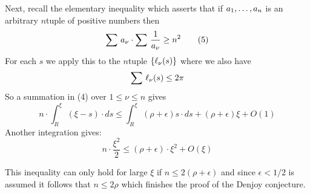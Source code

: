 \noindent
Next, recall the elementary inequality which asserts that if $a_ 1,\ldots,a_ n$
is an arbitrary $n$\vvv tuple of positive numbers then
\[
\sum\,a_ \nu\cdot \sum\, \frac{1}{a_\nu}\geq n^2
\tag{5}
\]
For each $s$ we apply this to the $n$\vvv tuple
$\{\ell_ \nu(s)\}$ where we also have
\[ 
\sum\,\ell_ \nu(s)\leq 2\pi
\] 
\noindent
So  a summation in (4) over $1\leq \nu\leq n$ gives
\[
n\cdot  \int_R^\xi\, (\xi-s)\cdot ds\leq
\int_R^\xi\, (\rho+\epsilon)s\cdot ds+(\rho+\epsilon)\xi+O(1)\tag{6}
\]
Another integration gives:
\[ 
n\cdot\frac{\xi^2}{2}\leq (\rho+\epsilon)\cdot \xi^2+O(\xi)\tag{7}
\]
\medskip

\noindent
This inequality can only hold for large $\xi$ if
$n\leq 2(\rho+\epsilon)$ and since  $\epsilon<1/2$ is assumed
it follows that 
$n\leq 2\rho$ which finishes the proof of the Denjoy conjecture.



\newpage



%




